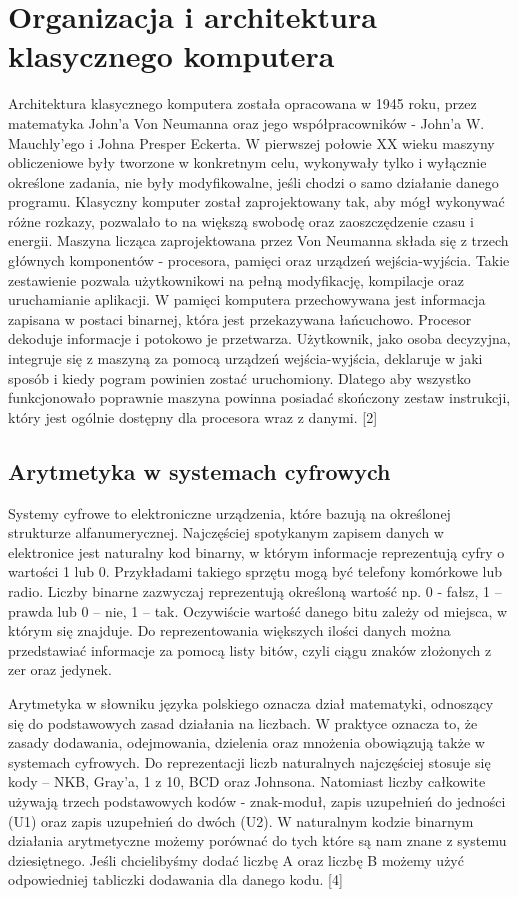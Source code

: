 \documentclass[12pt, a4paper, onside, polish]{article}				%
\begin{document}
\section{Organizacja i architektura klasycznego komputera}
\hspace{\parindent}
Architektura klasycznego komputera została opracowana w 1945 roku, przez matematyka John’a Von Neumanna oraz jego współpracowników - John’a W. Mauchly’ego i Johna Presper Eckerta. W pierwszej połowie XX wieku maszyny obliczeniowe były tworzone w konkretnym celu, wykonywały tylko i wyłącznie określone zadania, nie były modyfikowalne, jeśli chodzi o samo działanie danego programu. Klasyczny komputer został zaprojektowany tak, aby mógł wykonywać różne rozkazy, pozwalało to na większą swobodę oraz zaoszczędzenie czasu i energii. Maszyna licząca zaprojektowana przez Von Neumanna składa się z trzech głównych komponentów - procesora, pamięci oraz urządzeń wejścia-wyjścia. Takie zestawienie pozwala użytkownikowi na pełną modyfikację, kompilacje oraz uruchamianie aplikacji. W pamięci komputera przechowywana jest informacja zapisana w postaci binarnej, która jest przekazywana łańcuchowo. Procesor dekoduje informacje i potokowo je przetwarza. Użytkownik, jako osoba decyzyjna, integruje się z maszyną za pomocą urządzeń wejścia-wyjścia, deklaruje w jaki sposób i kiedy pogram powinien zostać uruchomiony. Dlatego aby wszystko funkcjonowało poprawnie maszyna powinna posiadać skończony zestaw instrukcji, który jest ogólnie dostępny dla procesora wraz z danymi. [2]
 
\subsection{Arytmetyka w systemach cyfrowych}
\hspace{\parindent}
Systemy cyfrowe to elektroniczne urządzenia, które bazują na określonej strukturze alfanumerycznej. Najczęściej spotykanym zapisem danych w elektronice jest naturalny kod binarny, w którym informacje reprezentują cyfry o wartości 1 lub 0.  Przykładami takiego sprzętu mogą być telefony komórkowe lub radio. Liczby binarne zazwyczaj reprezentują określoną wartość np. 0 - fałsz, 1 – prawda lub 0 – nie, 1 – tak. Oczywiście wartość danego bitu zależy od miejsca, w którym się znajduje. Do reprezentowania większych ilości danych można przedstawiać informacje za pomocą listy bitów, czyli ciągu znaków złożonych z zer oraz jedynek. 

Arytmetyka w słowniku języka polskiego oznacza dział matematyki, odnoszący się do podstawowych zasad działania na liczbach. W praktyce oznacza to, że zasady dodawania, odejmowania, dzielenia oraz mnożenia obowiązują także w systemach cyfrowych. Do reprezentacji liczb naturalnych najczęściej stosuje się kody – NKB, Gray’a, 1 z 10, BCD oraz Johnsona. Natomiast liczby całkowite używają trzech podstawowych kodów - znak-moduł, zapis uzupełnień do jedności (U1) oraz zapis uzupełnień do dwóch (U2). W naturalnym kodzie binarnym działania arytmetyczne możemy porównać do tych które są nam znane z systemu dziesiętnego. Jeśli chcielibyśmy dodać liczbę A oraz liczbę B możemy użyć odpowiedniej tabliczki dodawania dla danego kodu. [4]
\end{document}
